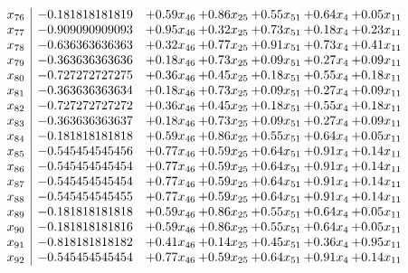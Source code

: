 \documentclass[8pt]{article}
\begin{document}
\[\begin{array}{c| c c@{\hskip 2pt} c@{\hskip 2pt} c@{\hskip 2pt} c@{\hskip 2pt} c@{\hskip 2pt} }
 x_{76}   &  -0.181818181819 & +  0.59 x_{46} & +  0.86 x_{25} & +  0.55 x_{51} & +  0.64 x_{4} & +  0.05 x_{11}\\
 x_{77}   &  -0.909090909093 & +  0.95 x_{46} & +  0.32 x_{25} & +  0.73 x_{51} & +  0.18 x_{4} & +  0.23 x_{11}\\
 x_{78}   &  -0.636363636363 & +  0.32 x_{46} & +  0.77 x_{25} & +  0.91 x_{51} & +  0.73 x_{4} & +  0.41 x_{11}\\
 x_{79}   &  -0.363636363636 & +  0.18 x_{46} & +  0.73 x_{25} & +  0.09 x_{51} & +  0.27 x_{4} & +  0.09 x_{11}\\
 x_{80}   &  -0.727272727275 & +  0.36 x_{46} & +  0.45 x_{25} & +  0.18 x_{51} & +  0.55 x_{4} & +  0.18 x_{11}\\
 x_{81}   &  -0.363636363634 & +  0.18 x_{46} & +  0.73 x_{25} & +  0.09 x_{51} & +  0.27 x_{4} & +  0.09 x_{11}\\
 x_{82}   &  -0.727272727272 & +  0.36 x_{46} & +  0.45 x_{25} & +  0.18 x_{51} & +  0.55 x_{4} & +  0.18 x_{11}\\
 x_{83}   &  -0.363636363637 & +  0.18 x_{46} & +  0.73 x_{25} & +  0.09 x_{51} & +  0.27 x_{4} & +  0.09 x_{11}\\
 x_{84}   &  -0.181818181818 & +  0.59 x_{46} & +  0.86 x_{25} & +  0.55 x_{51} & +  0.64 x_{4} & +  0.05 x_{11}\\
 x_{85}   &  -0.545454545456 & +  0.77 x_{46} & +  0.59 x_{25} & +  0.64 x_{51} & +  0.91 x_{4} & +  0.14 x_{11}\\
 x_{86}   &  -0.545454545454 & +  0.77 x_{46} & +  0.59 x_{25} & +  0.64 x_{51} & +  0.91 x_{4} & +  0.14 x_{11}\\
 x_{87}   &  -0.545454545454 & +  0.77 x_{46} & +  0.59 x_{25} & +  0.64 x_{51} & +  0.91 x_{4} & +  0.14 x_{11}\\
 x_{88}   &  -0.545454545455 & +  0.77 x_{46} & +  0.59 x_{25} & +  0.64 x_{51} & +  0.91 x_{4} & +  0.14 x_{11}\\
 x_{89}   &  -0.181818181818 & +  0.59 x_{46} & +  0.86 x_{25} & +  0.55 x_{51} & +  0.64 x_{4} & +  0.05 x_{11}\\
 x_{90}   &  -0.181818181816 & +  0.59 x_{46} & +  0.86 x_{25} & +  0.55 x_{51} & +  0.64 x_{4} & +  0.05 x_{11}\\
 x_{91}   &  -0.818181818182 & +  0.41 x_{46} & +  0.14 x_{25} & +  0.45 x_{51} & +  0.36 x_{4} & +  0.95 x_{11}\\
 x_{92}   &  -0.545454545454 & +  0.77 x_{46} & +  0.59 x_{25} & +  0.64 x_{51} & +  0.91 x_{4} & +  0.14 x_{11}\\

\end{array}\]
\end{document}

